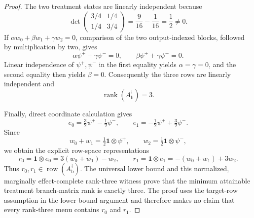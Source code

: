 \documentclass{article}
\begin{document}
\begin{proof}
The two treatment states are linearly independent because
\[
\det\begin{pmatrix}
3/4&1/4\\
1/4&3/4
\end{pmatrix}
=\frac{9}{16}-\frac{1}{16}
=\frac12
\neq0.
\]
If \(\alpha w_0+\beta w_1+\gamma w_2=0\), comparison of the two
output-indexed blocks, followed by multiplication by two, gives
\[
\alpha\psi^{+}+\gamma\psi^{-}=0,
\qquad
\beta\psi^{+}+\gamma\psi^{-}=0.
\]
Linear independence of \(\psi^{+},\psi^{-}\) in the first equality yields
\(\alpha=\gamma=0\), and the second equality then yields \(\beta=0\).
Consequently the three rows are linearly independent and
\[
\operatorname{rank}(A_{\mathrm b}^{\dagger})=3.
\]

Finally, direct coordinate calculation gives
\[
e_0=\tfrac32\psi^{+}-\tfrac12\psi^{-},
\qquad
e_1=-\tfrac12\psi^{+}+\tfrac32\psi^{-}.
\]
Since
\[
w_0+w_1=\tfrac12\mathbf 1\otimes\psi^{+},
\qquad
w_2=\tfrac12\mathbf 1\otimes\psi^{-},
\]
we obtain the explicit row-space representations
\[
r_0=\mathbf 1\otimes e_0=3(w_0+w_1)-w_2,
\qquad
r_1=\mathbf 1\otimes e_1=-(w_0+w_1)+3w_2.
\]
Thus \(r_0,r_1\in\operatorname{row}(A_{\mathrm b}^{\dagger})\).  The
universal lower bound and this normalized, marginally effect-complete
rank-three witness prove that the minimum attainable treatment branch-matrix
rank is exactly three.  The proof uses the target-row assumption in the
lower-bound argument and therefore makes no claim that every rank-three menu
contains \(r_0\) and \(r_1\).
\end{proof}
\end{document}
